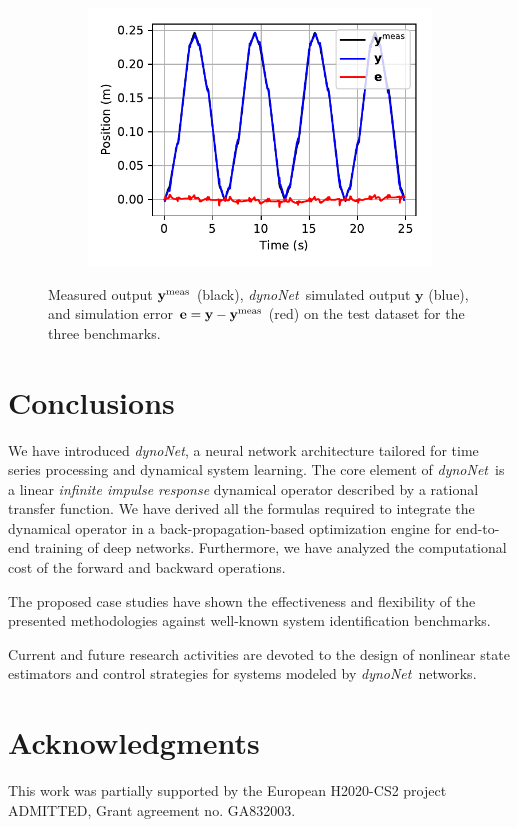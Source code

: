 \documentclass{article}
\newcommand{\tvec}[1]{\mathbf{#1}}
\newcommand{\Name}{\emph{dynoNet}}
\begin{document}
\begin{figure}[h]
\begin{subfigure}{.33\textwidth}
		\label{fig:result_BW}
	\end{subfigure}%
	\begin{subfigure}{.33\textwidth}
		\centering
		\includegraphics[width=\linewidth]{fig/EMPS_timetrace.pdf}
		\label{fig:result_EMPS}
	\end{subfigure}%
	\caption{Measured output $\tvec{y}^{\rm meas}$ (black), \Name\ simulated output $\tvec{y}$ (blue), and  simulation error 
		$\tvec{e}=\tvec{y}-\tvec{y}^{\rm meas}$ (red)
		on the test dataset for the three benchmarks.}
	\label{fig:result}
\end{figure}


\section{Conclusions}
We have introduced \Name, a neural network architecture tailored for time series processing and dynamical system learning. The core element of  \Name \  is a linear \emph{infinite impulse response} dynamical operator described by a rational transfer function.  We have derived all the formulas required to integrate the  dynamical operator in a back-propagation-based optimization engine for end-to-end training of deep  networks. 
Furthermore,  we have analyzed the computational cost of the forward and backward operations.

The proposed case studies have shown the effectiveness and flexibility of the presented methodologies against well-known system identification benchmarks. 

Current and future research activities are devoted to the design of nonlinear  state estimators   and control strategies for systems modeled  by  \Name\ networks.


\section*{Acknowledgments}
This work was partially supported by the European H2020-CS2 project ADMITTED, Grant agreement no. GA832003.






\end{document}
